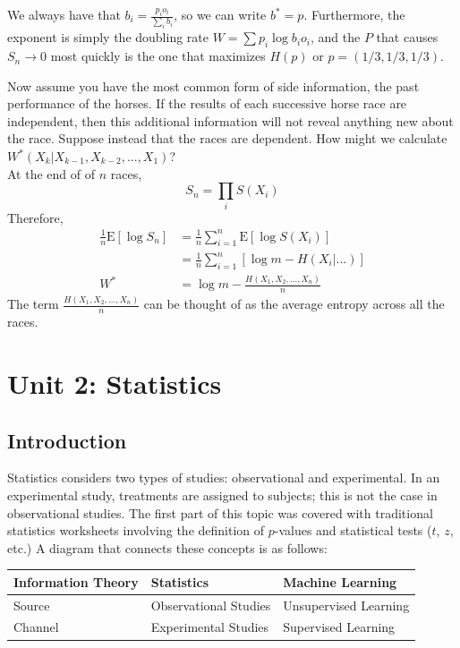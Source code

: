\documentclass[11pt]{article}
\theoremstyle{definition}
\begin{document}
We always have that $b_i = \frac{p_i o_i}{\sum_i b_i}$, so we can write $b^* = p$. Furthermore, the exponent is simply the doubling rate $W = \sum p_i \log b_i o_i$, and the $P$ that causes $S_n \rightarrow 0$ most quickly is the one that maximizes $H(p)$ or $p = (1/3, 1/3, 1/3)$. 

\example Now assume you have the most common form of side information, the past performance of the horses. If the results of each successive horse race are independent, then this additional information will not reveal anything new about the race. Suppose instead that the races are dependent. How might we calculate $W^*(X_k | X_{k-1}, X_{k-2},..., X_1)$?\\

\noindent At the end of of $n$ races, $$S_n = \prod_i S(X_i)$$
Therefore,
\begin{align*}
\frac{1}{n} \mathrm{E}\left[\log{S_n}\right] &= \frac{1}{n} \sum_{i=1}^{n} \mathrm{E}\left[\log{S(X_i)}\right]\\
							        &= \frac{1}{n} \sum_{i=1}^{n} \left[\log{m} - H(X_i | ...)\right]\\
							  W^*&=  \log{m} - \frac{H(X_1, X_2,...,X_n)}{n}
\end{align*}
The term $\frac{H(X_1, X_2,...,X_n)}{n}$ can be thought of as the average entropy across all the races. 

\section{Unit 2: Statistics}

\subsection{Introduction}
Statistics considers two types of studies: observational and experimental. In an experimental study, treatments are assigned to subjects; this is not the case in observational studies. The first part of this topic was covered with traditional statistics worksheets involving the definition of $p$-values and statistical tests ($t$, $z$, etc.) A diagram that connects these concepts is as follows:

\begin{table}[ht]
\centering
\begin{tabular}{@{}lll@{}}
\toprule
Information Theory & Statistics            & Machine Learning      \\ \midrule
Source             & Observational Studies & Unsupervised Learning \\
Channel            & Experimental Studies  & Supervised Learning   \\ \bottomrule
\end{tabular}
\end{table}
\end{document}
